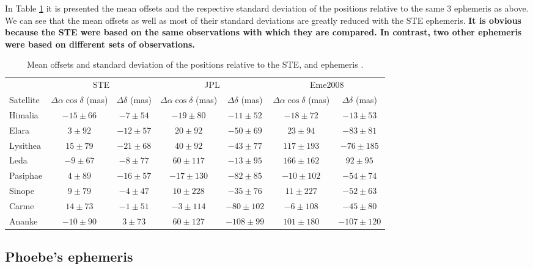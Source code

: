 \documentclass[useAMS,usenatbib]{mn2e}
\begin{document}
In Table \ref{Tab:STE-error} it is presented the mean offsets and the respective standard deviation of the  positions relative to the same 3 ephemeris as above. We can see that the mean offsets as well as most of their standard deviations are greatly reduced with the STE ephemeris. \textbf{It is obvious because the STE were based on the same observations with which they are compared. In contrast, two other ephemeris
were based on different sets of observations.}

\begin{table}
\caption{\label{Tab:STE-error} Mean offsets and standard deviation of the \protect{} positions relative to the STE, \protect\cite{Jacobson2012} and \protect\cite{Emelyanov2005} ephemeris .}
\begin{centering}
\begin{tabular}{l|cc|cc|cc}
\hline  \hline
 & \multicolumn{2}{|c|}{STE} & \multicolumn{2}{|c|}{JPL} & \multicolumn{2}{|c}{Eme2008}\tabularnewline
Satellite  & $\Delta\alpha\cos\delta$ (mas) & $\Delta\delta$ (mas) & $\Delta\alpha\cos\delta$ (mas) & $\Delta\delta$ (mas) & $\Delta\alpha\cos\delta$ (mas) & $\Delta\delta$ (mas) \tabularnewline
\hline
Himalia & $-15\pm66$ & $-7\pm54$  & $-19\pm80$  & $-11\pm52$ & $-18\pm72$  & $-13\pm53$ \tabularnewline
Elara & $3\pm92$ & $-12\pm57$ & $20\pm92$ & $-50\pm69$ & $23\pm94$ & $-83\pm81$ \tabularnewline
Lysithea & $15\pm79$ & $-21\pm68$ & $40\pm92$ & $-43\pm77$ & $117\pm193$ & $-76\pm185$ \tabularnewline
Leda & $-9\pm67$ & $-8\pm77$ & $60\pm117$ & $-13\pm95$ & $166\pm162$ & $92\pm95$ \tabularnewline
Pasiphae & $4\pm89$ & $-16\pm57$ & $-17\pm130$ & $-82\pm85$ & $-10\pm102$ & $-54\pm74$ \tabularnewline
Sinope & $9\pm79$ & $-4\pm47$ & $10\pm228$ & $-35\pm76$ & $11\pm227$ & $-52\pm63$ \tabularnewline
Carme & $14\pm73$ & $-1\pm51$ & $-3\pm114$ & $-80\pm102$ & $-6\pm108$ & $-45\pm80$ \tabularnewline
Ananke & $-10\pm90$ & $3\pm73$ & $60\pm127$ & $-108\pm99$ & $101\pm180$ & $-107\pm120$ \tabularnewline
\hline
\end{tabular}
\par \end{centering}
\end{table}



\subsection{Phoebe's ephemeris}
\end{document}
